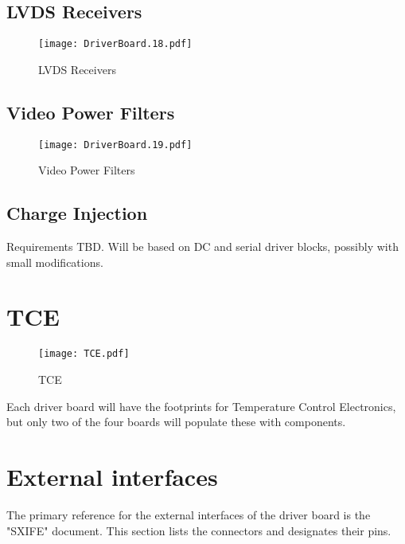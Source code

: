 \documentclass[a4paper,12pt]{article}
\begin{document}
\subsection{LVDS Receivers}
   \begin{figure}
   \begin{center}
   \texttt{[image: DriverBoard.18.pdf]}
   \end{center}
   \caption{LVDS Receivers}
   \end{figure}

\subsection{Video Power Filters}
   \begin{figure}
   \begin{center}
   \texttt{[image: DriverBoard.19.pdf]}
   \end{center}
   \caption{Video Power Filters}
   \end{figure}


\subsection{Charge Injection}

Requirements TBD. Will be based on DC and serial driver blocks, possibly with small modifications.

\section{TCE}

   \begin{figure}
   \begin{center}
   \texttt{[image: TCE.pdf]}
   \end{center}
   \caption{TCE}
   \end{figure}


Each driver board will have the footprints for Temperature Control Electronics, but only two of the four boards will populate these with components.

\section{External interfaces}

The primary reference for the external interfaces of the driver board is the "SXIFE" document. This section lists the connectors and designates their pins.
\end{document}
